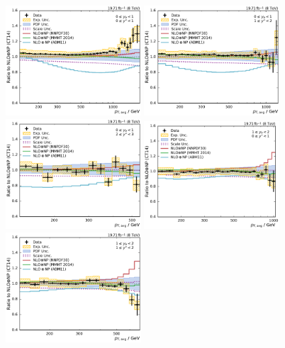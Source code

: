 \begin{figure}[h!tbp]
    \centering
    \includegraphics[width=0.45\textwidth]{figures/measurement/ratio_to_CT14nlo+np_totcomp_yb0ys0.pdf}\hfill
    \includegraphics[width=0.45\textwidth]{figures/measurement/ratio_to_CT14nlo+np_totcomp_yb0ys1.pdf}
    \includegraphics[width=0.45\textwidth]{figures/measurement/ratio_to_CT14nlo+np_totcomp_yb0ys2.pdf}\hfill
    \includegraphics[width=0.45\textwidth]{figures/measurement/ratio_to_CT14nlo+np_totcomp_yb1ys0.pdf}
    \includegraphics[width=0.45\textwidth]{figures/measurement/ratio_to_CT14nlo+np_totcomp_yb1ys1.pdf}\hfill

\end{figure}
